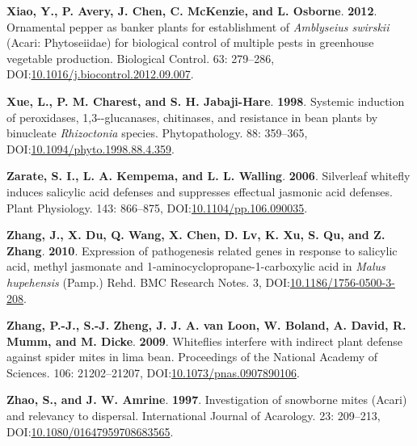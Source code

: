 \documentclass[12pt,final,CPage]{ufthesis}
\newlength{\cslhangindent}
\newenvironment{CSLReferences}[2] %
{%
	\setlength{\parindent}{0pt}
	\ifodd #1 \everypar{\setlength{\hangindent}{\cslhangindent}}\ignorespaces\fi
	\ifnum #2 > 0
	\setlength{\parskip}{#2\baselineskip}
	\fi
}%
{}
\begin{document}
{\begin{CSLReferences}{1}{0}
  \leavevmode{}%
  \textbf{Xiao, Y., P. Avery, J. Chen, C. McKenzie, and L. Osborne}. \textbf{2012}. Ornamental pepper as banker plants for establishment of {\emph{Amblyseius swirskii}} ({Acari}: {Phytoseiidae}) for biological control of multiple pests in greenhouse vegetable production. Biological Control. 63: 279--286, DOI:\href{https://doi.org/10.1016/j.biocontrol.2012.09.007}{10.1016/j.biocontrol.2012.09.007}.

  \leavevmode{}%
  \textbf{Xue, L., P. M. Charest, and S. H. Jabaji-Hare}. \textbf{1998}. Systemic induction of peroxidases, 1,3-\textbeta-glucanases, chitinases, and resistance in bean plants by binucleate {\emph{Rhizoctonia}} species. Phytopathology{\textregistered}. 88: 359--365, DOI:\href{https://doi.org/10.1094/phyto.1998.88.4.359}{10.1094/phyto.1998.88.4.359}.

  \leavevmode{}%
  \textbf{Zarate, S. I., L. A. Kempema, and L. L. Walling}. \textbf{2006}. Silverleaf whitefly induces salicylic acid defenses and suppresses effectual jasmonic acid defenses. Plant Physiology. 143: 866--875, DOI:\href{https://doi.org/10.1104/pp.106.090035}{10.1104/pp.106.090035}.

  \leavevmode{}%
  \textbf{Zhang, J., X. Du, Q. Wang, X. Chen, D. Lv, K. Xu, S. Qu, and Z. Zhang}. \textbf{2010}. Expression of pathogenesis related genes in response to salicylic acid, methyl jasmonate and 1-aminocyclopropane-1-carboxylic acid in {\emph{Malus hupehensis}} ({Pamp.}) {Rehd}. {BMC} Research Notes. 3, DOI:\href{https://doi.org/10.1186/1756-0500-3-208}{10.1186/1756-0500-3-208}.

  \leavevmode{}%
  \textbf{Zhang, P.-J., S.-J. Zheng, J. J. A. van Loon, W. Boland, A. David, R. Mumm, and M. Dicke}. \textbf{2009}. Whiteflies interfere with indirect plant defense against spider mites in lima bean. Proceedings of the National Academy of Sciences. 106: 21202--21207, DOI:\href{https://doi.org/10.1073/pnas.0907890106}{10.1073/pnas.0907890106}.

  \leavevmode{}%
  \textbf{Zhao, S., and J. W. Amrine}. \textbf{1997}. Investigation of snowborne mites ({Acari}) and relevancy to dispersal. International Journal of Acarology. 23: 209--213, DOI:\href{https://doi.org/10.1080/01647959708683565}{10.1080/01647959708683565}.


\end{CSLReferences}}
\end{document}
